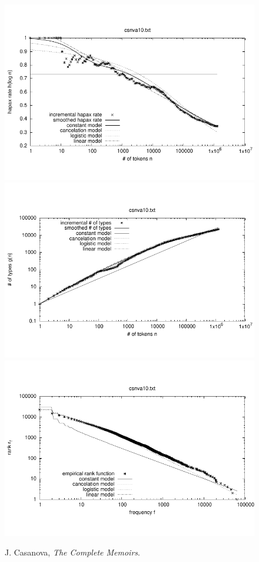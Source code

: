 \documentclass[a4paper,12pt]{article}
\begin{document}

\begin{figure}[p]
  \centering
  \vspace{-2em}
  \includegraphics[width=0.8\columnwidth]{output/herdan/csnva10_27/token_ratio.pdf}
  \\[-3em]
  \includegraphics[width=0.8\columnwidth]{output/herdan/csnva10_27/token_type.pdf}
  \\[-3em]
  \includegraphics[width=0.8\columnwidth]{output/herdan/csnva10_27/frequency_rank.pdf}
  \vspace{-2em}
  \caption{J. Casanova, \emph{The Complete Memoirs}.\label{figcsnva10F}}
\end{figure}
\end{document}
